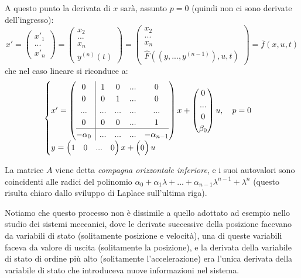 \documentclass[a4paper,11pt]{article}
\begin{document}
A questo punto la derivata di $x$ sarà, assunto $p = 0$ (quindi non ci sono derivate dell'ingresso): 
$$
x' = \begin{pmatrix}
x'_1 \\
... \\
x'_n
\end{pmatrix} = \begin{pmatrix}
x_2 \\
... \\
x_n \\ 
y^{(n)}(t)
\end{pmatrix}
= \begin{pmatrix}
x_2 \\
... \\
x_n \\
\hat{F} \left( (y, ..., y^{(n - 1)}), u, t \right)
\end{pmatrix}
= \overline{f}(x, u, t)
$$
che nel caso lineare si riconduce a:
\[
	\begin{cases}	
x' = \left(\begin{array}{@{}c | cccc@{}}
	0 & 1 & 0 & ... & 0 \\
	0 & 0 & 1 & ... & 0 \\
	... & ... & ... & ... & ... \\
	0 & 0 & 0 & ... & 1 \\
	\hline
	-\alpha_0 & ... & ... & ... & -\alpha_{n - 1}
\end{array}\right)
x + \begin{pmatrix}
0 \\
... \\
0 \\
\beta_0
\end{pmatrix} u, \quad p = 0 \\ 
y = \begin{pmatrix}
	1 & 0 & ... & 0
\end{pmatrix} x + \begin{pmatrix}
0
\end{pmatrix} u
	\end{cases}
\]

La matrice $A$ viene detta \textit{compagna orizzontale inferiore}, e i suoi autovalori sono coincidenti alle radici del polinomio $\alpha_0 + \alpha_1 \lambda + ... + \alpha_{n - 1} \lambda^{n - 1} + \lambda^n$ (questo risulta chiaro dallo sviluppo di Laplace sull'ultima riga).

\par\smallskip

Notiamo che questo processo non è dissimile a quello adottato ad esempio nello studio dei sistemi meccanici, dove le derivate successive della posizione facevano da variabili di stato (solitamente posizione e velocità), una di queste variabili faceva da valore di uscita (solitamente la posizione), e la derivata della variabile di stato di ordine più alto (solitamente l'accelerazione) era l'unica derivata della variabile di stato che introduceva nuove informazioni nel sistema.
\end{document}
